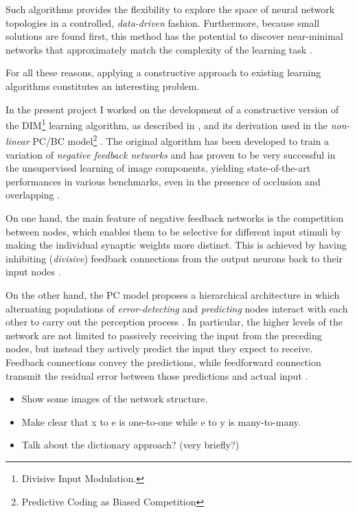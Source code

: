 \documentclass[11pt,a4paper]{report}
\begin{document}
			Such algorithms provides the flexibility to explore the space of neural network topologies in a controlled, \emph{data-driven} fashion. Furthermore, because small solutions are found first, this method has the potential to discover near-minimal networks that approximately match the complexity of the learning task \cite{parekh2000constructive}.
		
			For all these reasons, applying a constructive approach to existing learning algorithms constitutes an interesting problem.
		
			\newpage
		
			In the present project I worked on the development of a constructive version of the DIM\footnote{Divisive Input Modulation.} learning algorithm, as described in \cite{spratling2009unsupervised}, and its derivation \cite{spratling2012unsupervised} used in the \emph{non-linear} PC/BC model\footnote{Predictive Coding as Biased Competition} \cite{spratling2008predictive}. The original algorithm has been developed to train a variation of \emph{negative feedback networks} and has proven to be very successful in the unsupervised learning of image components, yielding state-of-the-art performances in various benchmarks, even in the presence of occlusion and overlapping \cite{spratling2009unsupervised}.
		
			On one hand, the main feature of negative feedback networks is the competition between nodes, which enables them to be selective for different input stimuli by making the individual synaptic weights more distinct. This is achieved by having inhibiting (\emph{divisive}) feedback connections from the output neurons back to their input nodes \cite{spratling2009unsupervised}. 
		
			On the other hand, the PC model proposes a hierarchical architecture in which alternating populations of \emph{error-detecting} and \emph{predicting} nodes interact with each other to carry out the perception process \cite{spratling2014predictive}. In particular, the higher levels of the network are not limited to passively receiving the input from the preceding nodes, but instead they actively predict the input they expect to receive. Feedback connections convey the predictions, while feedforward connection transmit the residual error between those predictions and actual input \cite{spratling2008predictive}.

			\begin{itemize}
				\item Show some images of the network structure.
				\item Make clear that x to e is one-to-one while e to y is many-to-many.
				\item Talk about the dictionary approach? (very briefly?)
			\end{itemize}
\end{document}
